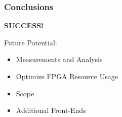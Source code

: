 \begin{frame}
    \frametitle{Conclusions}
    \begin{overprint}
        \centering
        \Huge\textbf{SUCCESS!}
    \end{overprint}

    \begin{overprint}
        \centering
        \vspace{1em}
        Future Potential:
        \begin{itemize}
            \item Measurements and Analysis
            \item Optimize FPGA Resource Usage %
            \item Scope %
            \item Additional Front-Ends
        \end{itemize}
    \end{overprint}
\end{frame}
